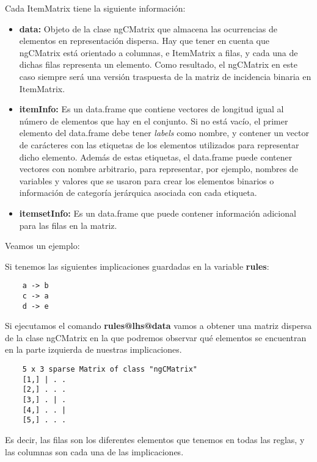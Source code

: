 Cada ItemMatrix tiene la siguiente informaci\'on:
\begin{itemize}

    \item \textbf{data:}
    Objeto de la clase ngCMatrix que almacena las ocurrencias de elementos en 
    representaci\'on dispersa. Hay que tener en cuenta que ngCMatrix est\'a orientado 
    a columnas, e ItemMatrix a filas, y cada una de dichas filas representa un elemento.
    Como resultado, el ngCMatrix en este caso siempre ser\'a una versi\'on traspuesta 
    de la matriz de incidencia binaria en ItemMatrix.


    \item \textbf{itemInfo:}
    Es un data.frame que contiene vectores de longitud igual al n\'umero de elementos que 
    hay en el conjunto. Si no est\'a vac\'io, el primer elemento del data.frame debe tener 
    \textit{labels} como nombre, y contener un vector de car\'acteres con las etiquetas de los 
    elementos utilizados para representar dicho elemento. Adem\'as de estas etiquetas, el 
    data.frame puede contener vectores con nombre arbitrario, para representar, por ejemplo, 
    nombres de variables y valores que se usaron para crear los elementos binarios o 
    informaci\'on de categor\'ia jer\'arquica asociada con cada etiqueta.


    \item \textbf{itemsetInfo:}
    Es un data.frame que puede contener informaci\'on adicional para las filas en la matriz.

\end{itemize}


Veamos un ejemplo:

Si tenemos las siguientes implicaciones guardadas en la variable \textbf{rules}:
\begin{verbatim}
    a -> b
    c -> a
    d -> e
\end{verbatim}


Si ejecutamos el comando \textbf{rules@lhs@data} vamos a obtener una matriz dispersa de la clase 
ngCMatrix en la que podremos observar qu\'e elementos se encuentran en la parte izquierda de 
nuestras implicaciones.

\begin{verbatim}
    5 x 3 sparse Matrix of class "ngCMatrix"
    [1,] | . .
    [2,] . . .
    [3,] . | .
    [4,] . . |
    [5,] . . .
\end{verbatim}

Es decir, las filas son los diferentes elementos que tenemos en todas las reglas, y las 
columnas son cada una de las implicaciones.


